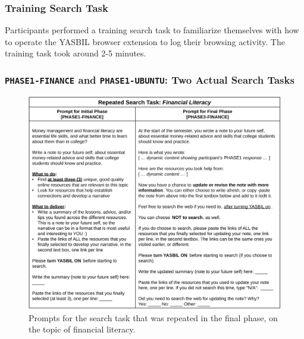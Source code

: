 \documentclass[letterpaper, nobind]{templates/ociamthesis}
\begin{document}
\hypertarget{training-search-task}{%
\subsubsection{Training Search Task}\label{training-search-task}}

Participants performed a training search task to familiarize themselves with how to operate the YASBIL browser extension to log their browsing activity. The training task took around 2-5 minutes.

\hypertarget{phase1-finance-and-phase1-ubuntu-two-actual-search-tasks}{%
\subsubsection{\texorpdfstring{\texttt{PHASE1-FINANCE} and \texttt{PHASE1-UBUNTU}: Two Actual Search Tasks}{PHASE1-FINANCE and PHASE1-UBUNTU: Two Actual Search Tasks}}\label{phase1-finance-and-phase1-ubuntu-two-actual-search-tasks}}

\begin{figure}

{\centering \includegraphics[width=1\linewidth]{figs/search-task-repeated} 

}

\caption[Prompts for repeated search task.]{Prompts for the search task that was repeated in the final phase, on the topic of financial literacy.}\label{fig:search-task-repeated}
\end{figure}
\end{document}
